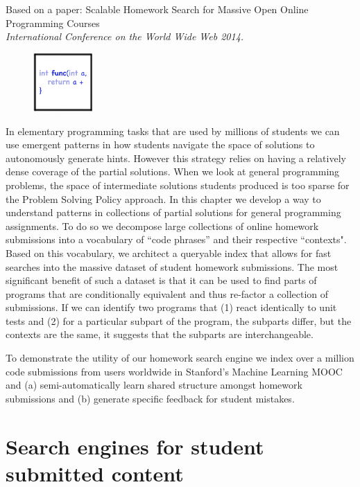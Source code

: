 Based on a paper: Scalable Homework Search for Massive Open
Online Programming Courses \cite{nguyen2014codewebs}\\ \emph{International Conference on the World Wide Web 2014.}

\vspace{7mm}

\begin{figure}[h!]
\includegraphics[width=0.2\textwidth]{img/assnType_4}
\end{figure}

\vspace{7mm}


In elementary programming tasks that are used by millions of students we can use emergent patterns in how students navigate the space of solutions to autonomously generate hints. However this strategy relies on having a relatively dense coverage of the partial solutions. When we look at general programming problems, the space of intermediate solutions students produced is too sparse for the Problem Solving Policy approach. In this chapter we develop a way to understand patterns in collections of partial solutions for general programming assignments. To do so we decompose large collections of online homework submissions into a vocabulary of ``code phrases'' and their respective ``contexts". Based on this vocabulary, we architect a queryable index that allows for fast searches into the massive dataset of student homework submissions. The most significant benefit of such a dataset is that it can be used to find parts of programs that are conditionally equivalent and thus re-factor a collection of submissions. If we can identify two programs that (1) react identically to unit tests and (2) for a particular subpart of the program, the subparts differ, but the contexts are the same, it suggests that the subparts are interchangeable.

To demonstrate the utility of our homework search engine we index over a million code submissions from users worldwide in Stanford's Machine Learning MOOC and (a) semi-automatically learn shared structure amongst homework submissions and (b)  generate specific feedback for student mistakes. 


\section{Search engines for student submitted content}


